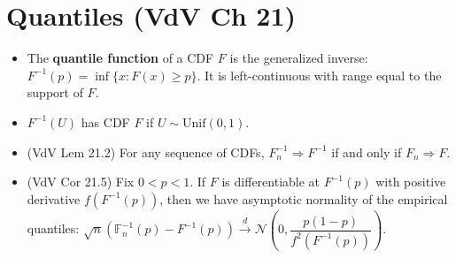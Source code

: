 \documentclass[twoside]{article}
\newcommand\calN{\mathcal{N}}
\newcommand\cd{\stackrel{d}{\goesto}}
\newcommand\goesto{\rightarrow}
\begin{document}
\section{Quantiles (VdV Ch 21)}
\begin{itemize}
\item The \textbf{quantile function} of a CDF $F$ is the generalized inverse: $F^{-1}(p) = \inf \{x: F(x) \geq p \}$. It is left-continuous with range equal to the support of $F$.

\item $F^{-1}(U)$ has CDF $F$ if $U \sim \text{Unif}(0,1)$.

\item (VdV Lem 21.2) For any sequence of CDFs, $F_n^{-1} \Rightarrow F^{-1}$ if and only if $F_n \Rightarrow F$.

\item (VdV Cor 21.5) Fix $0 < p < 1$. If $F$ is differentiable at $F^{-1}(p)$ with positive derivative $f(F^{-1}(p))$, then we have asymptotic normality of the empirical quantiles: $\sqrt{n} \left(\mathbb{F}_n^{-1}(p) - F^{-1}(p) \right) \cd \calN \left(0, \dfrac{p(1-p)}{f^2 (F^{-1}(p))} \right)$.
\end{itemize}
\end{document}
